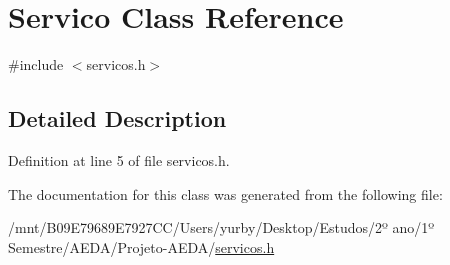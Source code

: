 \hypertarget{classServico}{}\section{Servico Class Reference}
\label{classServico}


{\ttfamily \#include $<$servicos.\+h$>$}



\subsection{Detailed Description}


Definition at line 5 of file servicos.\+h.



The documentation for this class was generated from the following file\+:\begin{DoxyCompactItemize}
\item 
/mnt/\+B09\+E79689\+E7927\+C\+C/\+Users/yurby/\+Desktop/\+Estudos/2º ano/1º Semestre/\+A\+E\+D\+A/\+Projeto-\/\+A\+E\+D\+A/\hyperlink{servicos_8h}{servicos.\+h}\end{DoxyCompactItemize}

